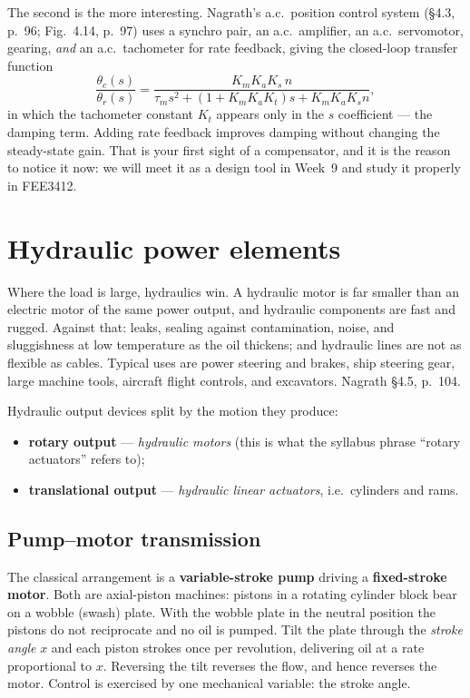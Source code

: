 \documentclass[11pt,a4paper]{article}
\begin{document}
The second is the more interesting. Nagrath's a.c.\ position control system
(\S4.3, p.~96; Fig.~4.14, p.~97) uses a synchro pair, an a.c.\ amplifier, an a.c.\
servomotor, gearing, \emph{and} an a.c.\ tachometer for rate feedback, giving
the closed-loop transfer function
\[
  \frac{\theta_c(s)}{\theta_r(s)}
   =\frac{K_mK_aK_s\,n}{\tau_m s^2+(1+K_mK_aK_t)s+K_mK_aK_s n},
\]
in which the tachometer constant $K_t$ appears only in the $s$ coefficient ---
the damping term. Adding rate feedback improves damping without changing the
steady-state gain. That is your first sight of a compensator, and it is the
reason to notice it now: we will meet it as a design tool in Week~9 and study
it properly in FEE3412.

\section{Hydraulic power elements}

Where the load is large, hydraulics win. A hydraulic motor is far smaller than
an electric motor of the same power output, and hydraulic components are fast
and rugged. Against that: leaks, sealing against contamination, noise, and
sluggishness at low temperature as the oil thickens; and hydraulic lines are
not as flexible as cables. Typical uses are power steering and brakes, ship
steering gear, large machine tools, aircraft flight controls, and excavators.
Nagrath \S4.5, p.~104.

Hydraulic output devices split by the motion they produce:
\begin{itemize}[leftmargin=*]
\item \textbf{rotary output} --- \emph{hydraulic motors} (this is what the
      syllabus phrase ``rotary actuators'' refers to);
\item \textbf{translational output} --- \emph{hydraulic linear actuators}, i.e.\
      cylinders and rams.
\end{itemize}

\subsection{Pump--motor transmission}

The classical arrangement is a \textbf{variable-stroke pump} driving a
\textbf{fixed-stroke motor}. Both are axial-piston machines: pistons in a
rotating cylinder block bear on a wobble (swash) plate. With the wobble plate
in the neutral position the pistons do not reciprocate and no oil is pumped.
Tilt the plate through the \emph{stroke angle} $x$ and each piston strokes once
per revolution, delivering oil at a rate proportional to $x$. Reversing the
tilt reverses the flow, and hence reverses the motor. Control is exercised by
one mechanical variable: the stroke angle.
\end{document}
